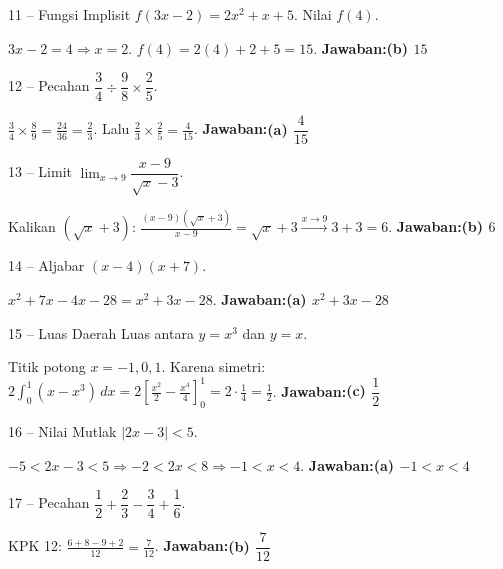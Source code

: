\documentclass[11pt]{article}
\newcommand{\jawaban}[1]{\textbf{Jawaban:}\enspace\colorbox{gold!30}{\textbf{#1}}}
\begin{document}
\begin{soal}{11 -- Fungsi Implisit}
$f(3x-2)=2x^2+x+5$. Nilai $f(4)$.
\end{soal}
\begin{pembox}
$3x-2=4\Rightarrow x=2$. $f(4)=2(4)+2+5=15$.
\jawaban{(b) $15$}
\end{pembox}

\begin{soal}{12 -- Pecahan}
$\dfrac34\div\dfrac98\times\dfrac25$.
\end{soal}
\begin{pembox}
$\frac34\times\frac89=\frac{24}{36}=\frac23$. Lalu $\frac23\times\frac25=\frac{4}{15}$.
\jawaban{(a) $\dfrac{4}{15}$}
\end{pembox}

\begin{soal}{13 -- Limit}
$\displaystyle\lim_{x\to9}\dfrac{x-9}{\sqrt x-3}$.
\end{soal}
\begin{pembox}
Kalikan $(\sqrt x+3)$: $\frac{(x-9)(\sqrt x+3)}{x-9}=\sqrt x+3\xrightarrow{x\to9}3+3=6$.
\jawaban{(b) $6$}
\end{pembox}

\begin{soal}{14 -- Aljabar}
$(x-4)(x+7)$.
\end{soal}
\begin{pembox}
$x^2+7x-4x-28=x^2+3x-28$.
\jawaban{(a) $x^2+3x-28$}
\end{pembox}

\begin{soal}{15 -- Luas Daerah}
Luas antara $y=x^3$ dan $y=x$.
\end{soal}
\begin{pembox}
Titik potong $x=-1,0,1$. Karena simetri: $2\int_0^1(x-x^3)\,dx=2\left[\frac{x^2}{2}-\frac{x^4}{4}\right]_0^1=2\cdot\frac14=\frac12$.
\jawaban{(c) $\dfrac12$}
\end{pembox}

\begin{soal}{16 -- Nilai Mutlak}
$|2x-3|<5$.
\end{soal}
\begin{pembox}
$-5<2x-3<5\Rightarrow-2<2x<8\Rightarrow-1<x<4$.
\jawaban{(a) $-1<x<4$}
\end{pembox}

\begin{soal}{17 -- Pecahan}
$\dfrac12+\dfrac23-\dfrac34+\dfrac16$.
\end{soal}
\begin{pembox}
KPK 12: $\frac{6+8-9+2}{12}=\frac{7}{12}$.
\jawaban{(b) $\dfrac{7}{12}$}
\end{pembox}
\end{document}
